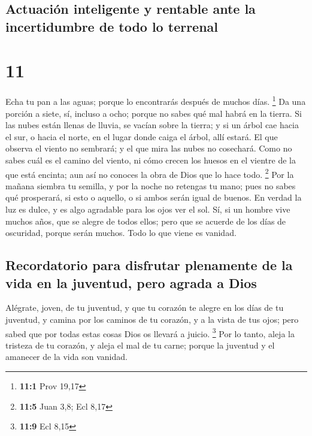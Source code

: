 \begin{paracol}{2}
{\subsection{Actuación inteligente y rentable ante la incertidumbre de
todo lo
terrenal}\label{actuaciuxf3n-inteligente-y-rentable-ante-la-incertidumbre-de-todo-lo-terrenal}}

\hypertarget{section-20}{%
\section{11}\label{section-20}}

 Echa tu pan a las aguas; porque lo encontrarás después de
muchos días. \footnote{\textbf{11:1} Prov 19,17}  Da una
porción a siete, sí, incluso a ocho; porque no sabes qué mal habrá en la
tierra.  Si las nubes están llenas de lluvia, se vacían
sobre la tierra; y si un árbol cae hacia el sur, o hacia el norte, en el
lugar donde caiga el árbol, allí estará.  El que observa
el viento no sembrará; y el que mira las nubes no cosechará.
 Como no sabes cuál es el camino del viento, ni cómo
crecen los huesos en el vientre de la que está encinta; aun así no
conoces la obra de Dios que lo hace todo. \footnote{\textbf{11:5} Juan
  3,8; Ecl 8,17}  Por la mañana siembra tu semilla, y por
la noche no retengas tu mano; pues no sabes qué prosperará, si esto o
aquello, o si ambos serán igual de buenos.  En verdad la
luz es dulce, y es algo agradable para los ojos ver el sol.
 Sí, si un hombre vive muchos años, que se alegre de todos
ellos; pero que se acuerde de los días de oscuridad, porque serán
muchos. Todo lo que viene es vanidad.

\hypertarget{recordatorio-para-disfrutar-plenamente-de-la-vida-en-la-juventud-pero-agrada-a-dios}{%
\subsection{Recordatorio para disfrutar plenamente de la vida en la
juventud, pero agrada a
Dios}\label{recordatorio-para-disfrutar-plenamente-de-la-vida-en-la-juventud-pero-agrada-a-dios}}

 Alégrate, joven, de tu juventud, y que tu corazón te
alegre en los días de tu juventud, y camina por los caminos de tu
corazón, y a la vista de tus ojos; pero sabed que por todas estas cosas
Dios os llevará a juicio. \footnote{\textbf{11:9} Ecl 8,15}
 Por lo tanto, aleja la tristeza de tu corazón, y aleja
el mal de tu carne; porque la juventud y el amanecer de la vida son
vanidad.


\end{paracol}
